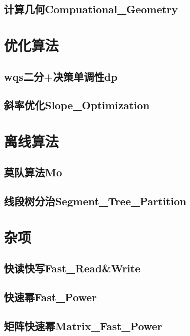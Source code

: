 \documentclass[10pt,a4paper]{article}
\begin{document}
\subsection{计算几何Compuational\_Geometry}


\newpage
\section{优化算法}
\subsection{wqs二分+决策单调性dp}

\subsection{斜率优化Slope\_Optimization}


\newpage
\section{离线算法}
\subsection{莫队算法Mo}

\subsection{线段树分治Segment\_Tree\_Partition}


\newpage
\section{杂项}
\subsection{快读快写Fast\_Read\&Write}

\subsection{快速幂Fast\_Power}

\subsection{矩阵快速幂Matrix\_Fast\_Power}

\end{document}

